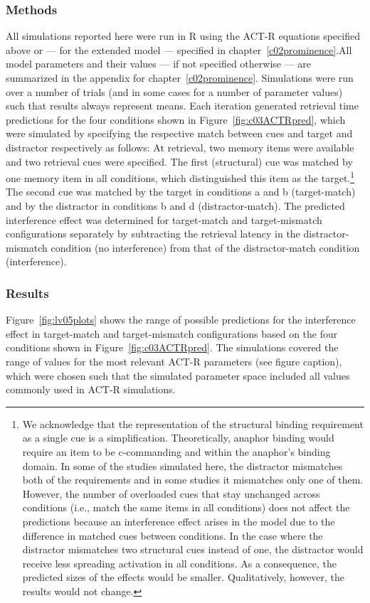 \documentclass{cambridge7A}\usepackage[]{graphicx}\usepackage[]{color}
\newcommand{\R}{\textsf{R}}
\begin{document}
\subsubsection{Methods}
\label{sec:generalmethods}
All simulations reported here were run in \R{} \citep{R2016} using the ACT-R equations specified above or --- for the extended model --- specified in chapter~\ref{c02prominence}.All model parameters and their values --- if not specified otherwise --- are summarized in the appendix for chapter~\ref{c02prominence}. Simulations were run over a number of trials (and in some cases for a number of parameter values) such that results always represent means. Each iteration generated retrieval time predictions for the four conditions shown in Figure~\ref{fig:c03ACTRpred}, which were simulated by specifying the respective match between cues and target and distractor respectively as follows: 
At retrieval, two memory items were available and two retrieval cues were specified. The first (structural) cue was matched by one memory item in all conditions, which distinguished this item as the target.\footnote{We acknowledge that the representation of the structural binding requirement as a single cue is a simplification. Theoretically, anaphor binding would require an item to be c-commanding and within the anaphor's binding domain. In some of the studies simulated here, the distractor mismatches both of the requirements and in some studies it mismatches only one of them. 
	However, the number of overloaded cues that stay unchanged across conditions (i.e., match the same items in all conditions) does not affect the predictions because an interference effect arises in the model due to the difference in matched cues between conditions. In the case where the distractor mismatches two structural cues instead of one, the distractor would receive less spreading activation in all conditions. As a consequence, the predicted sizes of the effects would be smaller. Qualitatively, however, the results would not change.}
The second cue was matched by the target in conditions a and b (target-match) and by the distractor in conditions b and d (distractor-match).
The predicted interference effect was determined for  target-match and  target-mismatch configurations separately by subtracting the retrieval latency in the distractor-mismatch condition (no interference) from that of the distractor-match condition (interference).  


\subsubsection{Results}
Figure~\ref{fig:lv05plots} shows the range of possible predictions for the interference effect in target-match and target-mismatch configurations based on the four conditions shown in Figure~\ref{fig:c03ACTRpred}.
The simulations covered the range of values for the most relevant ACT-R parameters (see figure caption), which were chosen such that the simulated parameter space included all values commonly used in ACT-R simulations.
\end{document}
